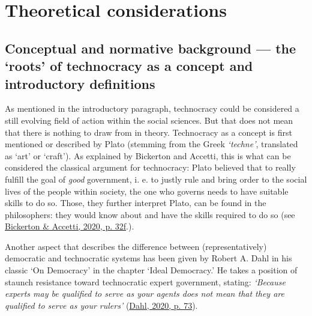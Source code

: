 \documentclass[
  12pt,
  english,
]{article}
\begin{document}
\hypertarget{theoretical-considerations}{%
\section{Theoretical considerations}\label{theoretical-considerations}}

\hypertarget{conceptual-and-normative-background-the-roots-of-technocracy-as-a-concept-and-introductory-definitions}{%
\subsection{Conceptual and normative background --- the `roots' of
technocracy as a concept and introductory
definitions}\label{conceptual-and-normative-background-the-roots-of-technocracy-as-a-concept-and-introductory-definitions}}

As mentioned in the introductory paragraph, technocracy could be
considered a still evolving field of action within the social sciences.
But that does not mean that there is nothing to draw from in theory.
Technocracy as a concept is first mentioned or described by Plato
(stemming from the Greek \emph{`techne'}, translated as `art' or
`craft'). As explained by Bickerton and Accetti, this is what can be
considered the classical argument for technocracy: Plato believed that
to really fulfill the goal of \emph{good} government, i. e. to justly
rule and bring order to the social lives of the people within society,
the one who governs needs to have suitable skills to do so. Those, they
further interpret Plato, can be found in the philosophers: they would
know about and have the skills required to do so (see
\protect\hyperlink{ref-bickerton2020technocracy}{Bickerton \& Accetti,
2020, p. 32f}.).

Another aspect that describes the difference between (representatively)
democratic and technocratic systems has been given by Robert A. Dahl in
his classic `On Democracy' in the chapter `Ideal Democracy.' He takes a
position of staunch resistance toward technocratic expert government,
stating: \emph{`Because experts may be qualified to serve as your agents
does not mean that they are qualified to serve as your rulers'}
(\protect\hyperlink{ref-dahl_onDemocracy}{Dahl, 2020, p. 73}).
\end{document}
